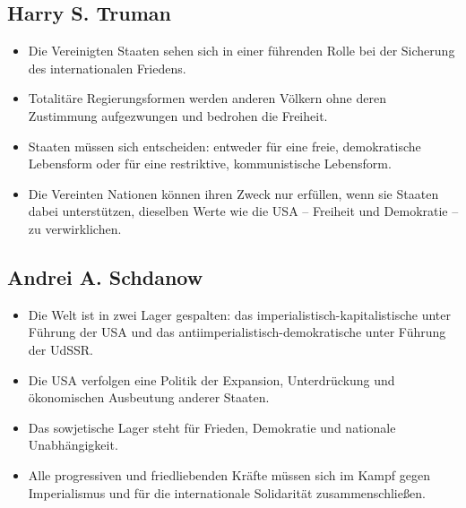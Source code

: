 \documentclass[11pt,a4paper,oneside]{article}
\begin{document}
	
	\newpage
	
	
	
	\begin{center}
		\begin{minipage}[t]{0.47\textwidth}
			\subsection*{Harry S. Truman}
			\begin{itemize}
				\item Die Vereinigten Staaten sehen sich in einer führenden Rolle bei der Sicherung des internationalen Friedens.
				\item Totalitäre Regierungsformen werden anderen Völkern ohne deren Zustimmung aufgezwungen und bedrohen die Freiheit.
				\item Staaten müssen sich entscheiden: entweder für eine freie, demokratische Lebensform oder für eine restriktive, kommunistische Lebensform.
				\item Die Vereinten Nationen können ihren Zweck nur erfüllen, wenn sie Staaten dabei unterstützen, dieselben Werte wie die USA – Freiheit und Demokratie – zu verwirklichen.
			\end{itemize}
		\end{minipage}\hfill
		\begin{minipage}[t]{0.47\textwidth}
			\subsection*{Andrei A. Schdanow}
			\begin{itemize}
				\item Die Welt ist in zwei Lager gespalten: das imperialistisch-kapitalistische unter Führung der USA und das antiimperialistisch-demokratische unter Führung der UdSSR.
				\item Die USA verfolgen eine Politik der Expansion, Unterdrückung und ökonomischen Ausbeutung anderer Staaten.
				\item Das sowjetische Lager steht für Frieden, Demokratie und nationale Unabhängigkeit.
				\item Alle progressiven und friedliebenden Kräfte müssen sich im Kampf gegen Imperialismus und für die internationale Solidarität zusammenschließen.
			\end{itemize}
		\end{minipage}
	\end{center}
	
	
	
\end{document}
